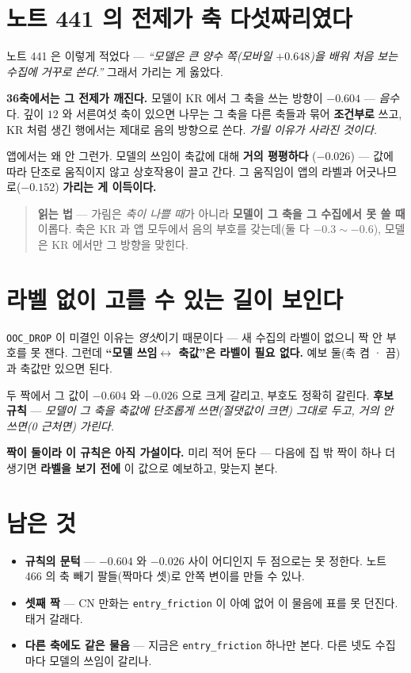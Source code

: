 \documentclass[11pt]{article}
\begin{document}
\section{노트 441 의 전제가 축 다섯짜리였다}

노트 441 은 이렇게 적었다 --- \emph{``모델은 큰 양수 쪽(모바일 $+0.648$)을
배워 처음 보는 수집에 거꾸로 쓴다.''} 그래서 가리는 게 옳았다.

\textbf{36축에서는 그 전제가 깨진다.} 모델이 KR 에서 그 축을 쓰는 방향이
$-0.604$ --- \emph{음수}다. 깊이 $12$ 와 서른여섯 축이 있으면 나무는 그
축을 다른 축들과 묶어 \textbf{조건부로} 쓰고, KR 처럼 생긴 행에서는
제대로 음의 방향으로 쓴다. \emph{가릴 이유가 사라진 것이다.}

앱에서는 왜 안 그런가. 모델의 쓰임이 축값에 대해 \textbf{거의 평평하다}
($-0.026$) --- 값에 따라 단조로 움직이지 않고 상호작용이 끌고 간다. 그
움직임이 앱의 라벨과 어긋나므로($-0.152$) \textbf{가리는 게 이득이다.}

\begin{quote}
\textbf{읽는 법} --- 가림은 \emph{축이 나쁠 때}가 아니라 \textbf{모델이
그 축을 그 수집에서 못 쓸 때} 이롭다. 축은 KR 과 앱 모두에서 음의 부호를
갖는데(둘 다 $-0.3 \sim -0.6$), 모델은 KR 에서만 그 방향을 맞힌다.
\end{quote}

\section{라벨 없이 고를 수 있는 길이 보인다}

\texttt{OOC\_DROP} 이 미결인 이유는 \emph{영샷}이기 때문이다 --- 새 수집의
라벨이 없으니 짝 안 부호를 못 잰다. 그런데 \textbf{``모델 쓰임$\leftrightarrow$
축값''은 라벨이 필요 없다.} 예보 둘(축 켬 · 끔)과 축값만 있으면 된다.

두 짝에서 그 값이 $-0.604$ 와 $-0.026$ 으로 크게 갈리고, 부호도 정확히
갈린다. \textbf{후보 규칙} --- \emph{모델이 그 축을 축값에 단조롭게
쓰면(절댓값이 크면) 그대로 두고, 거의 안 쓰면(0 근처면) 가린다.}

\textbf{짝이 둘이라 이 규칙은 아직 가설이다.} 미리 적어 둔다 --- 다음에
집 밖 짝이 하나 더 생기면 \textbf{라벨을 보기 전에} 이 값으로 예보하고,
맞는지 본다.

\section*{남은 것}

\begin{itemize}
\item \textbf{규칙의 문턱} --- $-0.604$ 와 $-0.026$ 사이 어디인지 두
점으로는 못 정한다. 노트 466 의 축 빼기 팔들(짝마다 셋)로 안쪽 변이를
만들 수 있나.
\item \textbf{셋째 짝} --- CN 만화는 \texttt{entry\_friction} 이 아예
없어 이 물음에 표를 못 던진다. 태거 갈래다.
\item \textbf{다른 축에도 같은 물음} --- 지금은 \texttt{entry\_friction}
하나만 본다. 다른 넷도 수집마다 모델의 쓰임이 갈리나.
\end{itemize}
\end{document}
